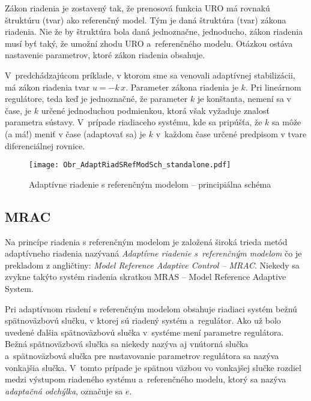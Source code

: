 \documentclass[a4paper, 10pt, ]{article}
\begin{document}
Zákon riadenia  je zostavený tak, že prenosová funkcia URO má rovnakú štruktúru (tvar) ako referenčný model. Tým je daná štruktúra (tvar) zákona riadenia. Nie že by štruktúra bola daná jednoznačne, jednoducho, zákon riadenia musí byť taký, že umožní zhodu URO a~referenčného modelu. Otázkou ostáva nastavenie parametrov, ktoré zákon riadenia obsahuje.

V~predchádzajúcom príklade, v ktorom sme sa venovali adaptívnej stabilizácii, má zákon riadenia tvar $u = -k\, x$. Parameter zákona riadenia je $k$. Pri lineárnom regulátore, teda keď je jednoznačné, že parameter $k$ je konštanta, nemení sa v čase, je $k$ určené jednoduchou podmienkou, ktorá však vyžaduje znalosť parametra sústavy. V~prípade riadiaceho systému, kde sa pripúšťa, že $k$ sa môže (a má!) meniť v čase (adaptovať sa) je $k$ v~každom čase určené predpisom v tvare diferenciálnej rovnice.








\begin{figure}[!t]
\centering

	\texttt{[image: Obr\_AdaptRiadSRefModSch\_standalone.pdf]}

	\caption{Adaptívne riadenie s referenčným modelom -- principiálna schéma}
	\label{Adaptívne riadenie s referenčným modelom --- principiálna schéma}

\end{figure}







\subsection{MRAC}

Na princípe riadenia s referenčným modelom je založená široká trieda metód adaptívneho riadenia nazývaná \emph{Adaptívne riadenie s~referenčným modelom} čo je prekladom z angličtiny: \emph{Model Reference Adaptive Control -- MRAC}. Niekedy sa zvykne takýto systém riadenia skratkou MRAS -- Model Reference Adaptive System.

Pri adaptívnom riadení s referenčným modelom obsahuje riadiaci systém bežnú spätnoväzbovú slučku, v ktorej sú riadený systém a~regulátor. Ako už bolo uvedené ďalšia spätnoväzbovú slučka v~systéme mení parametre regulátora. Bežná spätnoväzbová slučka sa niekedy nazýva aj vnútorná slučka a~spätnoväzbová slučka pre nastavovanie parametrov regulátora sa nazýva vonkajšia slučka. V~tomto prípade je spätnou väzbou vo vonkajšej slučke rozdiel medzi výstupom riadeného systému a~referenčného modelu, ktorý sa nazýva \emph{adaptačná odchýlka}, označuje sa $e$.
\end{document}
